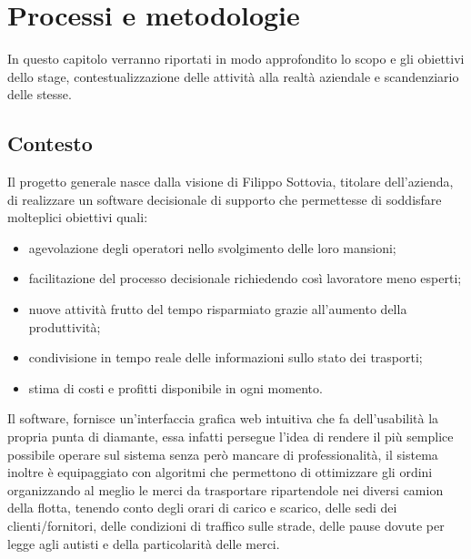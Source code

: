\hypertarget{(chap:capitolo2)}{}
\chapter{Processi e metodologie}
In questo capitolo verranno riportati in modo approfondito lo scopo e gli obiettivi dello stage, contestualizzazione delle attività alla realtà aziendale e scandenziario delle stesse.

\section{Contesto}
Il progetto generale nasce dalla visione di Filippo Sottovia, titolare dell'azienda, di realizzare un software decisionale di supporto che permettesse di soddisfare molteplici obiettivi quali:
\begin{itemize}
	\item agevolazione degli operatori nello svolgimento delle loro mansioni;
	\item facilitazione del processo decisionale richiedendo così lavoratore meno esperti;
	\item nuove attività frutto del tempo risparmiato grazie all'aumento della produttività;
	\item condivisione in tempo reale delle informazioni sullo stato dei trasporti;
	\item stima di costi e profitti disponibile in ogni momento.
\end{itemize}

Il software, fornisce un'interfaccia grafica web intuitiva che fa dell'usabilità la propria punta di diamante, essa infatti persegue l'idea di rendere il più semplice possibile operare sul sistema senza però mancare di professionalità, il sistema inoltre è equipaggiato con algoritmi che permettono di ottimizzare gli ordini organizzando al meglio le merci da trasportare ripartendole nei diversi camion della flotta, tenendo conto degli orari di carico e scarico, delle sedi dei clienti/fornitori, delle condizioni di traffico sulle strade, delle pause dovute per legge agli autisti e della particolarità delle merci.

